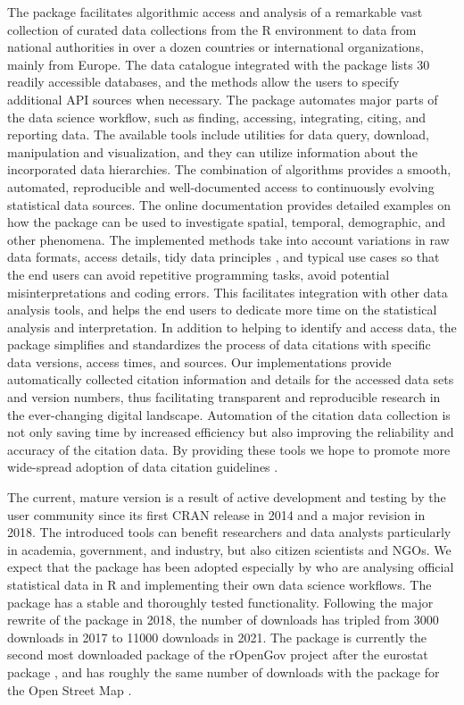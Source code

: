 The package facilitates algorithmic access and analysis of a
remarkable vast collection of curated data collections from the R
environment to data from national authorities in over a dozen
countries or international organizations, mainly from Europe. The data
catalogue integrated with the package lists 30 readily accessible
databases, and the methods allow the users to specify additional API
sources when necessary. The package automates major parts of the data
science workflow, such as finding, accessing, integrating, citing, and
reporting data. The available tools include utilities for data query,
download, manipulation and visualization, and they can utilize
information about the incorporated data hierarchies. The combination
of algorithms provides a smooth, automated, reproducible and
well-documented access to continuously evolving statistical data
sources. The online documentation provides detailed examples on how
the package can be used to investigate spatial, temporal, demographic,
and other phenomena. The implemented methods take into account
variations in raw data formats, access details, tidy data
principles \citep{wickham2014}, and typical use cases so that the end
users can avoid repetitive programming tasks, avoid potential
misinterpretations and coding errors. This facilitates integration
with other data analysis tools, and helps the end users to dedicate
more time on the statistical analysis and interpretation. In addition
to helping to identify and access data, the package simplifies and
standardizes the process of data citations with specific data
versions, access times, and sources. Our implementations provide
automatically collected citation information and details for the
accessed data sets and version numbers, thus facilitating transparent
and reproducible research in the ever-changing digital
landscape. Automation of the citation data collection is not only
saving time by increased efficiency but also improving the reliability
and accuracy of the citation data. By providing these tools we hope to
promote more wide-spread adoption of data citation
guidelines \cite{xxx}.

The current, mature version is a result of active development and
testing by the user community since its first CRAN release in 2014 and
a major revision in 2018. The introduced tools can benefit researchers
and data analysts particularly in academia, government, and industry,
but also citizen scientists and NGOs. We expect that the package has
been adopted especially by who are analysing official statistical data
in R and implementing their own data science workflows. The package
has a stable and thoroughly tested functionality. Following the major
rewrite of the package in 2018, the number of downloads has tripled
from 3000 downloads in 2017 to 11000 downloads in 2021. The package is
currently the second most downloaded package of the rOpenGov project
after the eurostat  package \cite{Lahti17eurostat}, and
has roughly the same number of downloads with the 
package for the Open Street Map \cite{osmar}.

